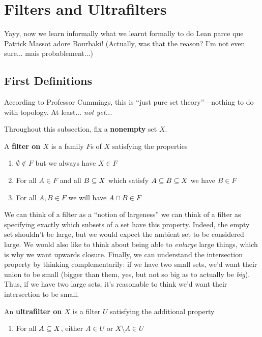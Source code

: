 \section{Filters and Ultrafilters}

Yayy, now we learn informally what we learnt formally to do Lean parce que Patrick Massot adore Bourbaki! (Actually, was that the reason? I'm not even sure... mais probablement...)
\subsection{First Definitions}

According to Professor Cummings, this is ``just pure set theory''---nothing to do with topology. At least... \textit{not yet...}

Throughout this subsection, fix a \textbf{nonempty} set $X$.

\begin{boxdefinition}[Filter]
    A \textbf{filter on $X$} is a family $F$s of $X$ satisfying the properties
    \begin{enumerate}[label = \textbf{F\arabic*.}]
        \item $\emptyset \notin F$ but we always have $X\in F$
        \item For all $A\in F$ and all $B\subseteq X$ which satisfy $A\subseteq B \subseteq X$ we have $B\in F$
        \item For all $A,B\in F$ we will have $A\cap B \in F$
    \end{enumerate} 
\end{boxdefinition}

We can think of a filter as a ``notion of largeness'' we can think of a filter as specifying exactly which subsets of a set have this property. Indeed, the empty set shouldn't be large, but we would expect the ambient set to be considered large. We would also like to think about being able to \textit{enlarge} large things, which is why we want upwards closure. Finally, we can understand the intersection property by thinking complementarily: if we have two small sets, we'd want their union to be small (bigger than them, yes, but not so big as to actually be \textit{big}). Thus, if we have two large sets, it's reasonable to think we'd want their intersection to be small.

\begin{boxdefinition}[Ultrafilter]
    An \textbf{ultrafilter on $X$} is a filter $U$ satisfying the additional property
    \begin{enumerate}[start = 4, label = \textbf{F\arabic*.}]
        \item For all $A \subseteq X$, either $A \in U$ or $X \setminus A \in U$
    \end{enumerate}
\end{boxdefinition}

